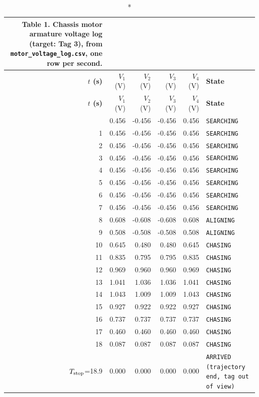 \begin{longtable}{@{}rrrrrp{5.2cm}@{}}
\caption*{\textbf{Table 1.} Chassis motor armature voltage log (target: Tag 3), from \texttt{motor\_voltage\_log.csv}, one row per second.}\\
\toprule
\textbf{$t$ (s)} & $V_1$ (V) & $V_2$ (V) & $V_3$ (V) & $V_4$ (V) & \textbf{State}\\
\midrule
\endfirsthead
\toprule
\textbf{$t$ (s)} & $V_1$ (V) & $V_2$ (V) & $V_3$ (V) & $V_4$ (V) & \textbf{State}\\
\midrule
\endhead
\bottomrule
\endfoot
0 & 0.456 & -0.456 & -0.456 & 0.456 & \texttt{SEARCHING}\\
1 & 0.456 & -0.456 & -0.456 & 0.456 & \texttt{SEARCHING}\\
2 & 0.456 & -0.456 & -0.456 & 0.456 & \texttt{SEARCHING}\\
3 & 0.456 & -0.456 & -0.456 & 0.456 & \texttt{SEARCHING}\\
4 & 0.456 & -0.456 & -0.456 & 0.456 & \texttt{SEARCHING}\\
5 & 0.456 & -0.456 & -0.456 & 0.456 & \texttt{SEARCHING}\\
6 & 0.456 & -0.456 & -0.456 & 0.456 & \texttt{SEARCHING}\\
7 & 0.456 & -0.456 & -0.456 & 0.456 & \texttt{SEARCHING}\\
8 & 0.608 & -0.608 & -0.608 & 0.608 & \texttt{ALIGNING}\\
9 & 0.508 & -0.508 & -0.508 & 0.508 & \texttt{ALIGNING}\\
10 & 0.645 & 0.480 & 0.480 & 0.645 & \texttt{CHASING}\\
11 & 0.835 & 0.795 & 0.795 & 0.835 & \texttt{CHASING}\\
12 & 0.969 & 0.960 & 0.960 & 0.969 & \texttt{CHASING}\\
13 & 1.041 & 1.036 & 1.036 & 1.041 & \texttt{CHASING}\\
14 & 1.043 & 1.009 & 1.009 & 1.043 & \texttt{CHASING}\\
15 & 0.927 & 0.922 & 0.922 & 0.927 & \texttt{CHASING}\\
16 & 0.737 & 0.737 & 0.737 & 0.737 & \texttt{CHASING}\\
17 & 0.460 & 0.460 & 0.460 & 0.460 & \texttt{CHASING}\\
18 & 0.087 & 0.087 & 0.087 & 0.087 & \texttt{CHASING}\\
$T_{\rm stop}$=18.9 & 0.000 & 0.000 & 0.000 & 0.000 & \texttt{ARRIVED (trajectory end, tag out of view)}\\
\end{longtable}
